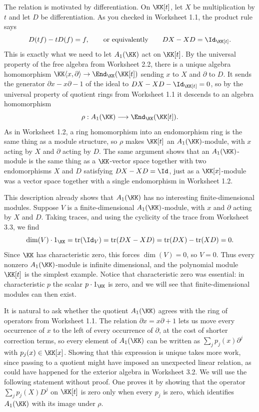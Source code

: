 \documentclass[12pt,reqno]{amsart}
\DeclareMathOperator{\tr}{tr}
\begin{document}
The relation is motivated by differentiation. On $\KK[t]$, let $X$ be multiplication by $t$ and let $D$ be differentiation. As you checked in Worksheet 1.1, the product rule says
\[
D(tf)-tD(f)=f,\qquad\text{or equivalently}\qquad DX-XD=\Id_{\KK[t]}.
\]
This is exactly what we need to let $A_1(\KK)$ act on $\KK[t]$. By the universal property of the free algebra from Worksheet 2.2, there is a unique algebra homomorphism $\KK\langle x,\partial\rangle\to\End_{\KK}(\KK[t])$ sending $x$ to $X$ and $\partial$ to $D$. It sends the generator $\partial x-x\partial-1$ of the ideal to $DX-XD-\Id_{\KK[t]}=0$, so by the universal property of quotient rings from Worksheet 1.1 it descends to an algebra homomorphism
\[
\rho:A_1(\KK)\longrightarrow\End_{\KK}(\KK[t]).
\]
As in Worksheet 1.2, a ring homomorphism into an endomorphism ring is the same thing as a module structure, so $\rho$ makes $\KK[t]$ an $A_1(\KK)$-module, with $x$ acting by $X$ and $\partial$ acting by $D$. The same argument shows that an $A_1(\KK)$-module is the same thing as a $\KK$-vector space together with two endomorphisms $X$ and $D$ satisfying $DX-XD=\Id$, just as a $\KK[x]$-module was a vector space together with a single endomorphism in Worksheet 1.2.

This description already shows that $A_1(\KK)$ has no interesting finite-dimensional modules. Suppose $V$ is a finite-dimensional $A_1(\KK)$-module, with $x$ and $\partial$ acting by $X$ and $D$. Taking traces, and using the cyclicity of the trace from Worksheet 3.3, we find
\[
\dim(V)\cdot1_{\KK}=\tr(\Id_V)=\tr(DX-XD)=\tr(DX)-\tr(XD)=0.
\]
Since $\KK$ has characteristic zero, this forces $\dim(V)=0$, so $V=0$. Thus every nonzero $A_1(\KK)$-module is infinite dimensional, and the polynomial module $\KK[t]$ is the simplest example. Notice that characteristic zero was essential: in characteristic $p$ the scalar $p\cdot1_{\KK}$ is zero, and we will see that finite-dimensional modules can then exist.

It is natural to ask whether the quotient $A_1(\KK)$ agrees with the ring of operators from Worksheet 1.1. The relation $\partial x=x\partial+1$ lets us move every occurrence of $x$ to the left of every occurrence of $\partial$, at the cost of shorter correction terms, so every element of $A_1(\KK)$ can be written as $\sum_jp_j(x)\partial^j$ with $p_j(x)\in\KK[x]$. Showing that this expression is unique takes more work, since passing to a quotient might have imposed an unexpected linear relation, as could have happened for the exterior algebra in Worksheet 3.2. We will use the following statement without proof. One proves it by showing that the operator $\sum_jp_j(X)D^j$ on $\KK[t]$ is zero only when every $p_j$ is zero, which identifies $A_1(\KK)$ with its image under $\rho$.
\end{document}
